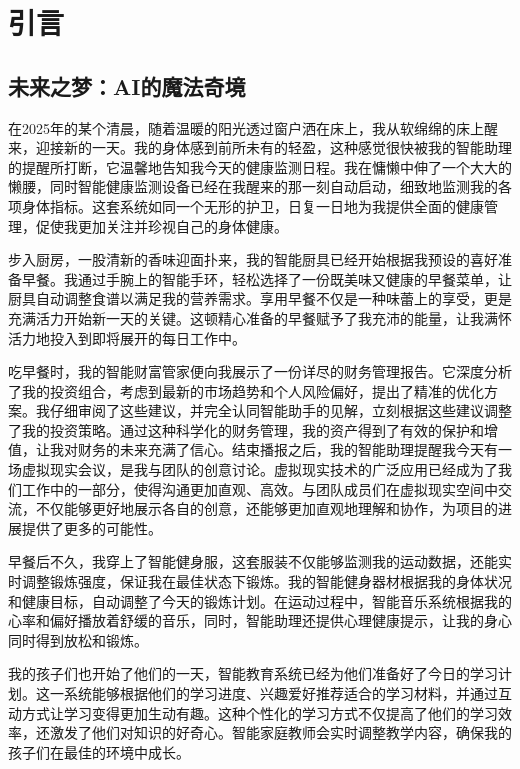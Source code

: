 \setchapterpreamble[u]{\margintoc}
\chapter{引言}

\section{未来之梦：AI的魔法奇境}

在2025年的某个清晨，随着温暖的阳光透过窗户洒在床上，我从软绵绵的床上醒来，迎接新的一天。我的身体感到前所未有的轻盈，这种感觉很快被我的智能助理的提醒所打断，它温馨地告知我今天的健康监测日程。我在慵懒中伸了一个大大的懒腰，同时智能健康监测设备已经在我醒来的那一刻自动启动，细致地监测我的各项身体指标。这套系统如同一个无形的护卫，日复一日地为我提供全面的健康管理，促使我更加关注并珍视自己的身体健康。

步入厨房，一股清新的香味迎面扑来，我的智能厨具已经开始根据我预设的喜好准备早餐。我通过手腕上的智能手环，轻松选择了一份既美味又健康的早餐菜单，让厨具自动调整食谱以满足我的营养需求。享用早餐不仅是一种味蕾上的享受，更是充满活力开始新一天的关键。这顿精心准备的早餐赋予了我充沛的能量，让我满怀活力地投入到即将展开的每日工作中。

吃早餐时，我的智能财富管家便向我展示了一份详尽的财务管理报告。它深度分析了我的投资组合，考虑到最新的市场趋势和个人风险偏好，提出了精准的优化方案。我仔细审阅了这些建议，并完全认同智能助手的见解，立刻根据这些建议调整了我的投资策略。通过这种科学化的财务管理，我的资产得到了有效的保护和增值，让我对财务的未来充满了信心。结束播报之后，我的智能助理提醒我今天有一场虚拟现实会议，是我与团队的创意讨论。虚拟现实技术的广泛应用已经成为了我们工作中的一部分，使得沟通更加直观、高效。与团队成员们在虚拟现实空间中交流，不仅能够更好地展示各自的创意，还能够更加直观地理解和协作，为项目的进展提供了更多的可能性。

早餐后不久，我穿上了智能健身服，这套服装不仅能够监测我的运动数据，还能实时调整锻炼强度，保证我在最佳状态下锻炼。我的智能健身器材根据我的身体状况和健康目标，自动调整了今天的锻炼计划。在运动过程中，智能音乐系统根据我的心率和偏好播放着舒缓的音乐，同时，智能助理还提供心理健康提示，让我的身心同时得到放松和锻炼。

我的孩子们也开始了他们的一天，智能教育系统已经为他们准备好了今日的学习计划。这一系统能够根据他们的学习进度、兴趣爱好推荐适合的学习材料，并通过互动方式让学习变得更加生动有趣。这种个性化的学习方式不仅提高了他们的学习效率，还激发了他们对知识的好奇心。智能家庭教师会实时调整教学内容，确保我的孩子们在最佳的环境中成长。

